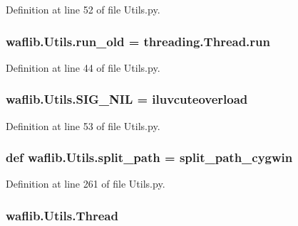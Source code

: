 Definition at line 52 of file Utils.\+py.

\subsubsection[{\texorpdfstring{run\+\_\+old}{run_old}}]{\setlength{\rightskip}{0pt plus 5cm}waflib.\+Utils.\+run\+\_\+old = threading.\+Thread.\+run}\hypertarget{namespacewaflib_1_1_utils_a96422e58ba2ec856c0afb76c8149ecda}{}\label{namespacewaflib_1_1_utils_a96422e58ba2ec856c0afb76c8149ecda}


Definition at line 44 of file Utils.\+py.

\subsubsection[{\texorpdfstring{S\+I\+G\+\_\+\+N\+IL}{SIG_NIL}}]{ waflib.\+Utils.\+S\+I\+G\+\_\+\+N\+IL = \textquotesingle{}iluvcuteoverload\textquotesingle{}}\hypertarget{namespacewaflib_1_1_utils_aba461c8de1ea539718eefe5013d2e39c}{}\label{namespacewaflib_1_1_utils_aba461c8de1ea539718eefe5013d2e39c}


Definition at line 53 of file Utils.\+py.

\subsubsection[{\texorpdfstring{split\+\_\+path}{split_path}}]{\setlength{\rightskip}{0pt plus 5cm}def waflib.\+Utils.\+split\+\_\+path = {\bf split\+\_\+path\+\_\+cygwin}}\hypertarget{namespacewaflib_1_1_utils_a8214050fc69f88de6a3bd092a66db512}{}\label{namespacewaflib_1_1_utils_a8214050fc69f88de6a3bd092a66db512}


Definition at line 261 of file Utils.\+py.

\subsubsection[{\texorpdfstring{Thread}{Thread}}]{\setlength{\rightskip}{0pt plus 5cm}waflib.\+Utils.\+Thread}\hypertarget{namespacewaflib_1_1_utils_a8b8c9376d2218d717e79be5533b85e76}{}\label{namespacewaflib_1_1_utils_a8b8c9376d2218d717e79be5533b85e76}



